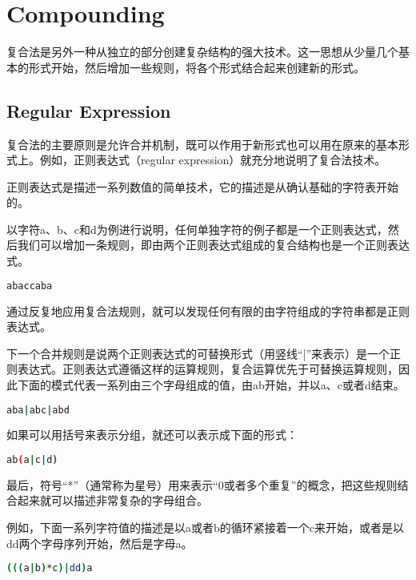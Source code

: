 \section{Compounding}


复合法是另外一种从独立的部分创建复杂结构的强大技术。这一思想从少量几个基本的形式开始，然后增加一些规则，将各个形式结合起来创建新的形式。


\subsection{Regular Expression}


复合法的主要原则是允许合并机制，既可以作用于新形式也可以用在原来的基本形式上。例如，正则表达式（regular expression）就充分地说明了复合法技术。

正则表达式是描述一系列数值的简单技术，它的描述是从确认基础的字符表开始的。

以字符a、b、c和d为例进行说明，任何单独字符的例子都是一个正则表达式，然后我们可以增加一条规则，即由两个正则表达式组成的复合结构也是一个正则表达式。

\begin{lstlisting}[language=bash]
abaccaba
\end{lstlisting}

通过反复地应用复合法规则，就可以发现任何有限的由字符组成的字符串都是正则表达式。



下一个合并规则是说两个正则表达式的可替换形式（用竖线“|”来表示）是一个正则表达式。正则表达式遵循这样的运算规则，复合运算优先于可替换运算规则，因此下面的模式代表一系列由三个字母组成的值，由ab开始，并以a、c或者d结束。

\begin{lstlisting}[language=bash]
aba|abc|abd
\end{lstlisting}

如果可以用括号来表示分组，就还可以表示成下面的形式：

\begin{lstlisting}[language=bash]
ab(a|c|d)
\end{lstlisting}


最后，符号“*”（通常称为星号）用来表示“0或者多个重复”的概念，把这些规则结合起来就可以描述非常复杂的字母组合。

例如，下面一系列字符值的描述是以a或者b的循环紧接着一个c来开始，或者是以dd两个字母序列开始，然后是字母a。

\begin{lstlisting}[language=bash]
(((a|b)*c)|dd)a
\end{lstlisting}

